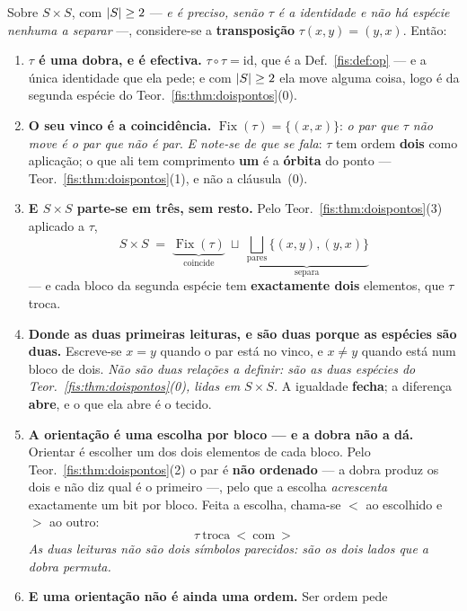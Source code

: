 \documentclass[livro.tex]{subfiles}
\begin{document}
\begin{teorema}\label{fis:thm:simbolos}
Sobre $S\times S$, com $\lvert S\rvert\ge2$ --- \emph{e é preciso, senão $\tau$ é a
identidade e não há espécie nenhuma a separar} ---, considere-se a
\textbf{transposição} $\tau(x,y)=(y,x)$. Então:
\begin{enumerate}\itemsep3pt
\item[(1)] \textbf{$\tau$ é uma dobra, e é efectiva.}
$\tau\circ\tau=\mathrm{id}$, que é a Def.~\ref{fis:def:op} --- e a única
identidade que ela pede; e com $\lvert S\rvert\ge2$ ela move alguma coisa, logo é da
segunda espécie do Teor.~\ref{fis:thm:doispontos}(0).
\item[(2)] \textbf{O seu vinco é a coincidência.}
$\operatorname{Fix}(\tau)=\{(x,x)\}$: \emph{o par que $\tau$ não move é o par que
não é par}. \emph{E note-se de que se fala}: $\tau$ tem ordem \textbf{dois} como
aplicação; o que ali tem comprimento \textbf{um} é a \textbf{órbita} do ponto ---
Teor.~\ref{fis:thm:doispontos}(1), e não a cláusula~(0).
\item[(3)] \textbf{E $S\times S$ parte-se em três, sem resto.} Pelo
Teor.~\ref{fis:thm:doispontos}(3) aplicado a $\tau$,
\[
\boxed{\;S\times S\;=\;\underbrace{\operatorname{Fix}(\tau)}_{\text{coincide}}
\ \sqcup\ \underbrace{\bigsqcup_{\text{pares}}\bigl\{(x,y),(y,x)\bigr\}}_{\text{separa}}\;}
\]
--- e cada bloco da segunda espécie tem \textbf{exactamente dois} elementos, que
$\tau$ troca.
\item[(4)] \textbf{Donde as duas primeiras leituras, e são duas porque as
espécies são duas.} Escreve-se $x=y$ quando o par está no vinco, e $x\neq y$
quando está num bloco de dois. \emph{Não são duas relações a definir: são as duas
espécies do Teor.~\ref{fis:thm:doispontos}(0), lidas em $S\times S$.} A igualdade
\textbf{fecha}; a diferença \textbf{abre}, e o que ela abre é o tecido.
\item[(5)] \textbf{A orientação é uma escolha por bloco --- e a dobra não a dá.}
Orientar é escolher um dos dois elementos de cada bloco. Pelo
Teor.~\ref{fis:thm:doispontos}(2) o par é \textbf{não ordenado} --- a dobra
produz os dois e não diz qual é o primeiro ---, pelo que a escolha
\emph{acrescenta} exactamente um bit por bloco. Feita a escolha, chama-se $<$ ao
escolhido e $>$ ao outro:
\[
\boxed{\;\tau\ \text{troca}\ <\ \text{com}\ >\;}
\]
\emph{As duas leituras não são dois símbolos parecidos: são os dois lados que a
dobra permuta.}
\item[(6)] \textbf{E uma orientação não é ainda uma ordem.} Ser ordem pede

\end{enumerate}
\end{teorema}
\end{document}
